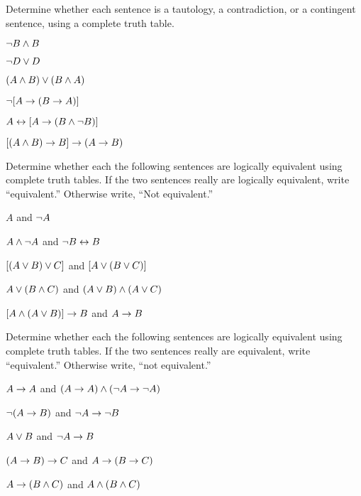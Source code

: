 \begin{practiceproblems}
\problempart Determine whether each sentence is a tautology, a contradiction, or a contingent sentence, using a complete truth table.
\begin{earg}
\item $\neg B \mathbin{\wedge} B$ \vspace{.5ex} \hfill {}


\item $\neg D \vee D$ \vspace{.5ex} \hfill {}


\item $(A\mathbin{\wedge} B) \vee (B\mathbin{\wedge} A)$\vspace{.5ex} \hfill {}


\item $\neg[A \rightarrow (B \rightarrow A)]$\vspace{.5ex} \hfill {}


\item $A \leftrightarrow [A \rightarrow (B \mathbin{\wedge} \neg B)]$ \vspace{.5ex} \hfill {}


\item $[(A \mathbin{\wedge} B) \rightarrow B] \rightarrow (A \rightarrow B)$ \vspace{.5ex} \hfill {}


\end{earg}

\noindent\problempart
\label{pr.TT.equiv}
Determine whether each the following sentences are logically equivalent using complete truth tables. If the two sentences really are logically equivalent, write ``equivalent.'' Otherwise write, ``Not equivalent.'' 
\begin{earg}
\item $A$ and $\neg A$
\item $A \mathbin{\wedge} \neg A$ and $\neg B \leftrightarrow B$
\item $[(A \vee B) \vee C]$ and $[A \vee (B \vee C)]$
\item $A \vee (B \mathbin{\wedge} C)$ and $(A \vee B) \mathbin{\wedge} (A \vee C)$
\item $[A \mathbin{\wedge} (A \vee B)] \rightarrow B$ and $A \rightarrow B$\end{earg}


\problempart
\label{pr.TT.equiv2}
Determine whether each the following sentences are logically equivalent using complete truth tables. If the two sentences really are equivalent, write ``equivalent.'' Otherwise write, ``not equivalent.''
\begin{earg}
\item $A\rightarrow A$ and $(A \rightarrow A)\wedge (\neg A\rightarrow\neg A)$
\item $\neg(A \rightarrow B)$ and $\neg A \rightarrow \neg B$
\item $A \vee B$ and $\neg A \rightarrow B$
\item$(A \rightarrow B) \rightarrow C$ and $A \rightarrow (B \rightarrow C)$
\item $A \rightarrow (B \mathbin{\wedge} C)$ and $A \mathbin{\wedge} (B \mathbin{\wedge} C)$
\end{earg}


\end{practiceproblems}
